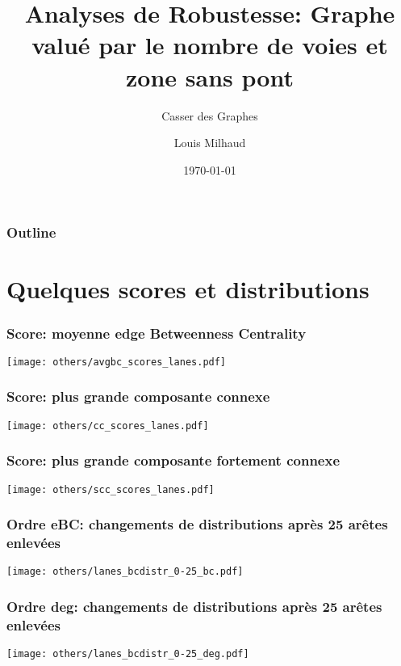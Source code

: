 \documentclass[aspectratio=169]{beamer}
\title{Analyses de Robustesse: Graphe valué par le nombre de voies et zone sans pont}
\subtitle{Casser des Graphes}
\author{Louis Milhaud}
\institute{Complex Networks - LIP6}
\date{\today}
\begin{document}
    \begin{frame}
        \titlepage
    \end{frame}

    \begin{frame}
        \frametitle{Outline}
        \tableofcontents
    \end{frame}

    \section{Quelques scores et distributions}

    \begin{frame}
        \frametitle{Score: moyenne edge Betweenness Centrality}
        \centering
        \texttt{[image: others/avgbc\_scores\_lanes.pdf]}
    \end{frame}

    \begin{frame}
        \frametitle{Score: plus grande composante connexe}
        \centering
        \texttt{[image: others/cc\_scores\_lanes.pdf]}
    \end{frame}

    \begin{frame}
        \frametitle{Score: plus grande composante fortement connexe}
        \centering
        \texttt{[image: others/scc\_scores\_lanes.pdf]}
    \end{frame}

    \begin{frame}
        \frametitle{Ordre eBC: changements de distributions après 25 arêtes enlevées}
        \centering
        \texttt{[image: others/lanes\_bcdistr\_0-25\_bc.pdf]}    
    \end{frame}

    \begin{frame}
        \frametitle{Ordre deg: changements de distributions après 25 arêtes enlevées}
        \centering
        \texttt{[image: others/lanes\_bcdistr\_0-25\_deg.pdf]}    
    \end{frame}
\end{document}
